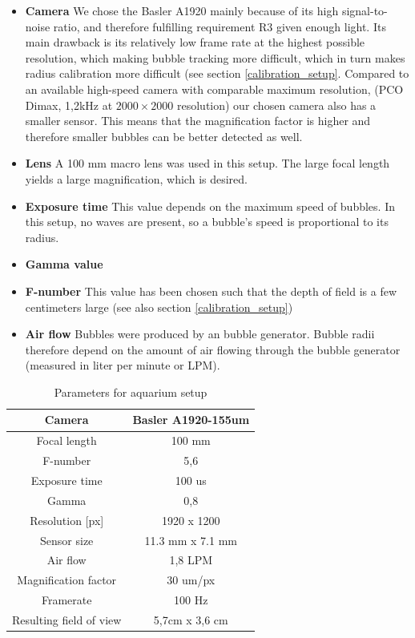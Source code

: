 		\begin{itemize}
		\item \textbf{Camera} We chose the Basler A1920 mainly because of its high signal-to-noise ratio, and therefore fulfilling requirement R3 given enough light. Its main drawback is its relatively low frame rate at the highest possible resolution, which making bubble tracking more difficult, which in turn makes radius calibration more difficult (see section \ref{calibration_setup}. Compared to an available high-speed camera with comparable maximum resolution, (PCO Dimax, 1,2kHz at $2000 \times 2000$ resolution) our chosen camera also has a smaller sensor. This means that the magnification factor is higher and therefore smaller bubbles can be better detected as well. 
		
		\item \textbf{Lens} A 100 mm macro lens was used in this setup. The large focal length yields a large magnification, which is desired.
		\item \textbf{Exposure time} This value depends on the maximum speed of bubbles. In this setup, no waves are present, so a bubble's speed is proportional to its radius. 
		\item \textbf{Gamma value}
		\item \textbf{F-number} This value has been chosen such that the depth of field is a few centimeters large (see also section \ref{calibration_setup})		
		\item \textbf{Air flow} Bubbles were produced by an bubble generator. Bubble radii therefore depend on the amount of air flowing through the bubble generator (measured in liter per minute or LPM).
		\end{itemize}
		
		\begin{table}
			\centering
		
			\begin{tabular}{|c|c|}
			\hline 
			Camera & Basler A1920-155um \\ 
			\hline 
			Focal length & 100 mm \\ 
			\hline 
			F-number & 5,6 \\ 
			\hline 
			Exposure time & 100 us \\ 
			\hline 
			Gamma & 0,8 \\
			\hline
			Resolution [px] &1920 x 1200 \\
			\hline 
			Sensor size & 11.3 mm x 7.1 mm \\
			\hline
			Air flow & 1,8 LPM \\ 
			\hline 
			Magnification factor & 30 um/px \\ 
			\hline 
			Framerate & 100 Hz \\ 
			\hline 
			Resulting field of view & 5,7cm x 3,6 cm \\
			\hline
			\end{tabular} 
			
			\caption{Parameters for aquarium setup}
			\label{tab:aquarium_param}

		\end{table}
		
